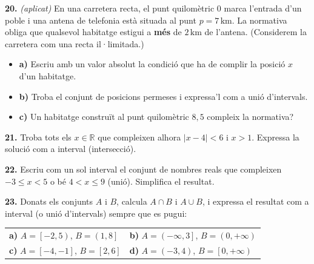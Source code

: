 \documentclass[13pt,a4paper]{extarticle}
\begin{document}
\par\noindent\begin{minipage}{\linewidth}
\textbf{20.} \emph{(aplicat)} En una carretera recta, el punt quilomètric $0$ marca l'entrada d'un poble i una antena de telefonia està situada al punt $p=7\,\text{km}$. La normativa obliga que qualsevol habitatge estigui a \textbf{més} de $2\,\text{km}$ de l'antena. (Considerem la carretera com una recta il·limitada.)\par

\begin{itemize}[leftmargin=0pt,itemsep=3pt,topsep=3pt,parsep=0pt,label={}]
\item \textbf{a)} Escriu amb un valor absolut la condició que ha de complir la posició $x$ d'un habitatge.
\item \textbf{b)} Troba el conjunt de posicions permeses i expressa'l com a unió d'intervals.
\item \textbf{c)} Un habitatge construït al punt quilomètric $8{,}5$ compleix la normativa?
\end{itemize}
\end{minipage}\par\vspace{1.6mm}
\par\noindent\begin{minipage}{\linewidth}
\textbf{21.} Troba tots els $x\in\mathbb{R}$ que compleixen alhora $|x-4|<6$ i $x>1$. Expressa la solució com a interval (intersecció).\par
\end{minipage}\par\vspace{1.6mm}
\par\noindent\begin{minipage}{\linewidth}
\textbf{22.} Escriu com un sol interval el conjunt de nombres reals que compleixen $-3\leq x<5$ o bé $4<x\leq 9$ (unió). Simplifica el resultat.\par
\end{minipage}\par\vspace{1.6mm}
\par\noindent\begin{minipage}{\linewidth}
\textbf{23.} Donats els conjunts $A$ i $B$, calcula $A\cap B$ i $A\cup B$, i expressa el resultat com a interval (o unió d'intervals) sempre que es pugui:\par

\begin{tabular}{@{}p{.46\linewidth}p{.46\linewidth}@{}}
\textbf{a)} $A=\left[-2,5\right)$, $B=\left(1,8\right]$ & \textbf{b)} $A=\left(-\infty,3\right]$, $B=\left(0,+\infty\right)$ \\[2pt]
\textbf{c)} $A=\left[-4,-1\right]$, $B=\left[2,6\right]$ & \textbf{d)} $A=\left(-3,4\right)$, $B=\left[0,+\infty\right)$ \\[2pt]
\end{tabular}\par
\end{minipage}\par\vspace{1.6mm}
\end{document}
